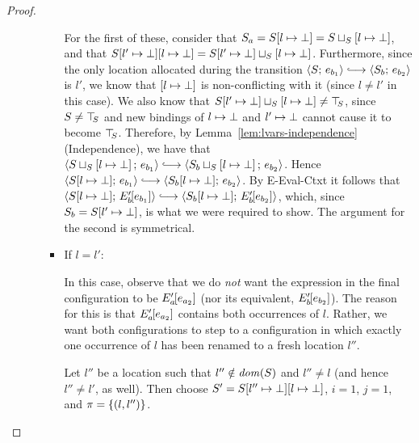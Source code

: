 \begin{proof}
\begin{enumerate}
\begin{enumerate}
\begin{itemize}
          For the first of these, consider that $S_a =
          S[l \mapsto \bot] =
          S \sqcup_{S} \left[ l \mapsto \bot \right]$, and that
          $S[l' \mapsto \bot][l \mapsto \bot] =
          S[l' \mapsto \bot] \sqcup_{S} \left[ l \mapsto \bot \right]$.
          Furthermore, since the only location allocated during the
          transition $\config{S}{e_{b_1}} \parstepsto
          \config{S_b}{e_{b_2}}$ is $l'$, we know that
          $\left[ l \mapsto \bot \right]$ is non-conflicting with
          it (since $l \neq l'$ in this case).  We also know that
          $S[l' \mapsto \bot] \sqcup_{S} \left[ l \mapsto \bot \right]
          \neq \top\hspace{-0.85mm}_{S}$, since $S \neq \top\hspace{-0.85mm}_{S}$ and new bindings of
          $l \mapsto \bot$ and $l' \mapsto \bot$
          cannot cause it to become $\top\hspace{-0.85mm}_{S}$.  Therefore, by
          Lemma~\ref{lem:lvars-independence} (Independence), we have
          that
          $\config{\lubstore{S}{\store{\storebindingRaw{l}{\bot}}}}{e_{b_1}}
          \parstepsto
          \config{\lubstore{S_b}{\store{\storebindingRaw{l}{\bot}}}}{e_{b_2}}$.
          Hence $\config{\extSRaw{S}{l}{\bot}}{e_{b_1}} \parstepsto
          \config{\extSRaw{S_b}{l}{\bot}}{e_{b_2}}$.  By {\sc
            E-Eval-Ctxt} it follows that
          $\config{\extSRaw{S}{l}{\bot}}{\evalctxt{E'_b}{e_{b_1}}}
          \parstepsto
          \config{\extSRaw{S_b}{l}{\bot}}{\evalctxt{E'_b}{e_{b_2}}}$,
          which, since $S_b = S[l' \mapsto \bot]$, is what we were
          required to show.  The argument for the second is
          symmetrical.

        \item If $l = l'$:

          In this case, observe that we do \emph{not} want the
          expression in the final configuration to be
          $E'_a\hspace{-1mm}\left[e_{a_2}\right]$ (nor its equivalent,
          $E'_b\hspace{-1mm}\left[e_{b_2}\right]$).  The reason for this is that
          $E'_a\hspace{-1mm}\left[e_{a_2}\right]$ contains both occurrences of $l$.
          Rather, we want both configurations to step to a
          configuration in which exactly one occurrence of $l$ has
          been renamed to a fresh location $l''$.

          Let $l''$ be a location such that $l'' \notin \mathit{dom}(S)$ and
          $l'' \neq l$ (and hence $l'' \neq l'$, as well).  Then
          choose $S' = S[l'' \mapsto \bot][l \mapsto \bot]$, $i
          = 1$, $j = 1$, and $\pi = \left\{(l, l'')\right\}$.


\end{itemize}
\end{enumerate}
\end{enumerate}
\end{proof}
